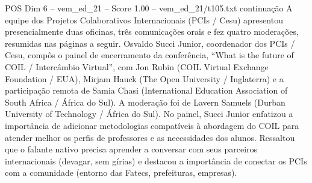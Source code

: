 \begin{textsample}{POS Dim 6 – vem\_ed\_21 – Score 1.00 – vem\_ed\_21/t105.txt}  \label{ex:f6_pos_123}
continuação A equipe dos Projetos Colaborativos Internacionais (PCIs / Cesu) apresentou presencialmente duas oficinas, três comunicações orais e fez quatro moderações, resumidas nas páginas a seguir.
Osvaldo Succi Junior, coordenador dos PCIs / Cesu, compôs o painel de encerramento da conferência, “What is the future of COIL / Intercâmbio Virtual”, com Jon Rubin (COIL Virtual Exchange Foundation / EUA), Mirjam Hauck (The Open University / Inglaterra) e a participação remota de Samia Chasi (International Education Association of South Africa / África do Sul).
A moderação foi de Lavern Samuels (Durban University of Technology / África do Sul).
No painel, Succi Junior enfatizou a importância de adicionar metodologias compatíveis à abordagem do COIL para atender melhor os perfis de professores e as necessidades dos alunos.
Ressaltou que o falante nativo precisa aprender a conversar com seus parceiros internacionais (devagar, sem gírias) e destacou a importância de conectar os PCIs com a comunidade (entorno das Fatecs, prefeituras, empresas).

\end{textsample}
